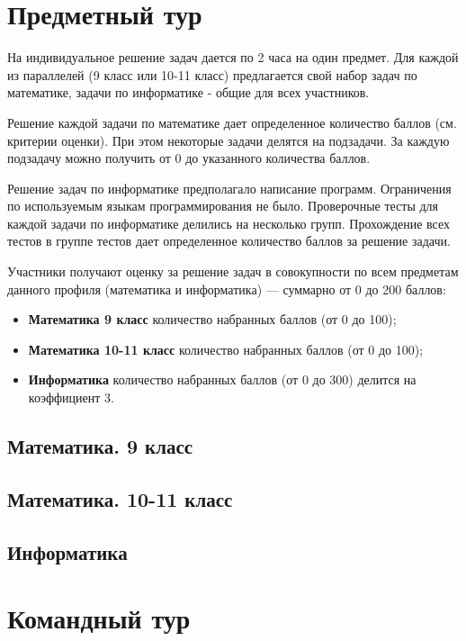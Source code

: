 \documentclass[a4paper,12pt,oneside]{book}
\begin{document}
\clearpage
\chapter{Предметный тур}

На индивидуальное решение задач дается по 2 часа на один предмет.
Для каждой из параллелей (9 класс или 10-11 класс) предлагается свой
набор задач по математике, задачи по информатике - общие для всех
участников.

Решение каждой задачи по математике дает определенное количество
баллов (см. критерии оценки). При этом некоторые задачи делятся на
подзадачи. За каждую подзадачу можно получить от 0 до указанного
количества баллов.

Решение задач по информатике предполагало написание программ.
Ограничения по используемым языкам программирования не было.
Проверочные тесты для каждой задачи по информатике делились на
несколько групп. Прохождение всех тестов в группе тестов дает
определенное количество баллов за решение задачи.

Участники получают оценку за решение задач в совокупности по
всем предметам данного профиля (математика и информатика) ---
суммарно от 0 до 200 баллов:

\begin{itemize}
    \item {\bf Математика 9 класс} количество набранных баллов
    (от 0 до 100);
    \item {\bf Математика 10-11 класс} количество набранных баллов
    (от 0 до 100);
    \item {\bf Информатика} количество набранных баллов (от 0 до
    300) делится на коэффициент 3.
\end{itemize}


\section{Математика. 9 класс}


\section{Математика. 10-11 класс}


\section{Информатика}


\chapter{Командный тур}




\end{document}
